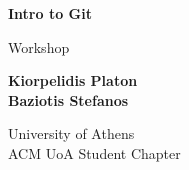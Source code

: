 \begin{titlepage}
	\begin{center}
		\vspace*{1cm}
		\Huge
		\textbf{{\la Intro to Git}}
		
		\vspace{0.5cm}
		\LARGE
		{\sf \la Workshop}

		\vspace{1.5cm}
		\large
		\textbf{\la Kiorpelidis Platon}\\
		\textbf{\la Baziotis Stefanos}

		\vfill
		

		\LARGE
		{\sf \la University of Athens}\\
		{\sf \la ACM UoA Student Chapter}
	\end{center}
\end{titlepage}

